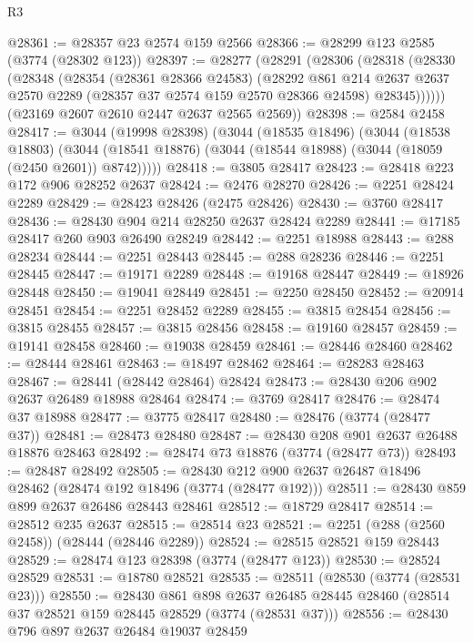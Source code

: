 \begin{lexlean}{R3}
\begin{coremodule}
@28361 := @28357 @23 @2574 @159 @2566
@28366 := @28299 @123 @2585 (@3774 (@28302 @123))
@28397 := @28277
    (@28291
      (@28306
        (@28318
          (@28330
            (@28348
              (@28354
                (@28361 @28366 @24583)
                (@28292
                  @861
                  @214
                  @2637
                  @2637
                  @2570
                  @2289
                  (@28357 @37 @2574 @159 @2570 @28366 @24598)
                  @28345))))))
      (@23169 @2607 @2610 @2447 @2637 @2565 @2569))
@28398 := @2584 @2458
@28417 := @3044
    (@19998 @28398)
    (@3044
      (@18535 @18496)
      (@3044
        (@18538 @18803)
        (@3044 (@18541 @18876) (@3044 (@18544 @18988) (@3044 (@18059 (@2450 @2601)) @8742)))))
@28418 := @3805 @28417
@28423 := @28418 @223 @172 @906 @28252 @2637
@28424 := @2476 @28270
@28426 := @2251 @28424 @2289
@28429 := @28423 @28426 (@2475 @28426)
@28430 := @3760 @28417
@28436 := @28430 @904 @214 @28250 @2637 @28424 @2289
@28441 := @17185 @28417 @260 @903 @26490 @28249
@28442 := @2251 @18988
@28443 := @288 @28234
@28444 := @2251 @28443
@28445 := @288 @28236
@28446 := @2251 @28445
@28447 := @19171 @2289
@28448 := @19168 @28447
@28449 := @18926 @28448
@28450 := @19041 @28449
@28451 := @2250 @28450
@28452 := @20914 @28451
@28454 := @2251 @28452 @2289
@28455 := @3815 @28454
@28456 := @3815 @28455
@28457 := @3815 @28456
@28458 := @19160 @28457
@28459 := @19141 @28458
@28460 := @19038 @28459
@28461 := @28446 @28460
@28462 := @28444 @28461
@28463 := @18497 @28462
@28464 := @28283 @28463
@28467 := @28441 (@28442 @28464) @28424
@28473 := @28430 @206 @902 @2637 @26489 @18988 @28464
@28474 := @3769 @28417
@28476 := @28474 @37 @18988
@28477 := @3775 @28417
@28480 := @28476 (@3774 (@28477 @37))
@28481 := @28473 @28480
@28487 := @28430 @208 @901 @2637 @26488 @18876 @28463
@28492 := @28474 @73 @18876 (@3774 (@28477 @73))
@28493 := @28487 @28492
@28505 := @28430 @212 @900 @2637 @26487 @18496 @28462 (@28474 @192 @18496 (@3774 (@28477 @192)))
@28511 := @28430 @859 @899 @2637 @26486 @28443 @28461
@28512 := @18729 @28417
@28514 := @28512 @235 @2637
@28515 := @28514 @23
@28521 := @2251 (@288 (@2560 @2458)) (@28444 (@28446 @2289))
@28524 := @28515 @28521 @159 @28443
@28529 := @28474 @123 @28398 (@3774 (@28477 @123))
@28530 := @28524 @28529
@28531 := @18780 @28521
@28535 := @28511 (@28530 (@3774 (@28531 @23)))
@28550 := @28430
    @861
    @898
    @2637
    @26485
    @28445
    @28460
    (@28514 @37 @28521 @159 @28445 @28529 (@3774 (@28531 @37)))
@28556 := @28430 @796 @897 @2637 @26484 @19037 @28459

\end{coremodule}
\end{lexlean}
